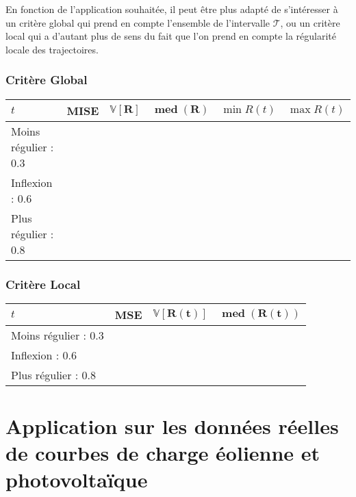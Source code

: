 En fonction de l'application souhaitée, il peut être plus adapté de s'intéresser à un critère global qui prend en compte l'ensemble de l'intervalle $\mathcal T$, ou un critère local qui a d'autant plus de sens du fait que l'on prend en compte la régularité locale des trajectoires.

\subsubsection{Critère Global}

\begin{tabularx}{\textwidth}{|l|X|X|X|X|X|}
	\toprule
	$t$                  & \textbf{MISE} & $\mathbf{\mathds V[R]}$ & $\mathbf{\operatorname{med}(R)}$ & $\min R(t)$ & $\max R(t)$\\
	\midrule
	Moins régulier : 0.3 &              &                            & & &
	\\
	Inflexion : 0.6      &              &                            & & &
	\\
	Plus régulier : 0.8  &              &                            & & &
	\\
	\bottomrule
\end{tabularx}

\subsubsection{Critère Local}

\begin{tabularx}{\textwidth}{|l|X|X|X|}
  \toprule
  $t$ &\textbf{MSE} & $\mathbf{\mathds V[R(t)]}$ & $\mathbf{\operatorname{med}(R(t))}$ \\
  \midrule
  Moins régulier : 0.3  & & & 
  \\
  Inflexion : 0.6       & & &
  \\
  Plus régulier : 0.8   & & &
  \\
  \bottomrule
\end{tabularx}

\section{
  Application sur les données réelles de courbes de charge éolienne et photovoltaïque
 }

